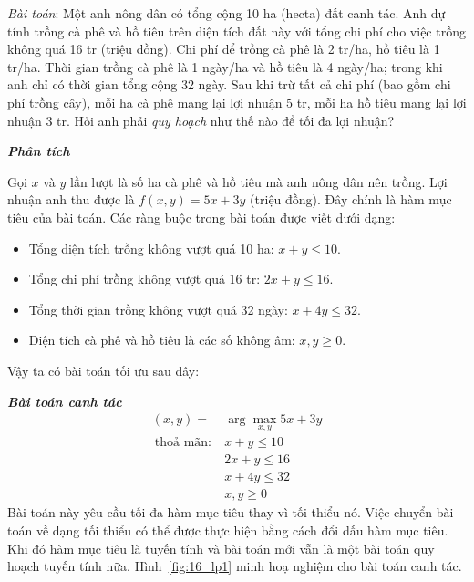 \textit{{Bài toán}}:
Một anh nông dân có tổng cộng 10 ha (hecta) đất canh tác. Anh dự tính trồng cà
phê và hồ tiêu trên diện tích đất này với tổng chi phí cho việc trồng không quá 16 tr (triệu đồng). Chi phí để trồng cà phê là 2 tr/ha, hồ
tiêu là 1 tr/ha. Thời gian trồng cà phê là 1 ngày/ha và hồ tiêu là 4 ngày/ha;
trong khi anh chỉ có thời gian tổng cộng 32 ngày. Sau khi trừ tất cả chi
phí (bao gồm chi phí trồng cây), mỗi ha cà phê mang lại lợi nhuận 5 tr, mỗi ha hồ
tiêu mang lại lợi nhuận 3 tr. Hỏi anh phải \textit{quy hoạch} như thế nào để tối
đa lợi nhuận?

\newpage
\textit{\textbf{Phân tích}}

Gọi $x$ và $y$ lần lượt là số ha cà phê và hồ tiêu mà anh nông dân nên trồng.
Lợi nhuận anh thu được là $f(x, y) = 5x + 3y$ (triệu đồng). Đây chính là hàm
mục tiêu của bài toán. Các ràng buộc trong bài toán được viết dưới dạng:
\begin{itemize}
\item Tổng diện tích trồng không vượt quá 10 ha: $x + y \leq 10$.

\item Tổng chi phí trồng không vượt quá 16 tr: $2x + y \leq 16$.

\item Tổng thời gian trồng không vượt quá 32 ngày: $x + 4y \leq 32$.

\item Diện tích cà phê và hồ tiêu là các số không âm: $x, y \geq 0$.
\end{itemize}
Vậy ta có bài toán tối ưu sau đây:


\textit{\textbf{Bài toán canh tác} }
\begin{equation}
\label{eqn:canhtac}
\begin{aligned}
(x, y) =& \arg\max_{x, y} 5x + 3y \\\
\text{thoả mãn:}~ & x + y \leq 10 \\\
& 2x + y \leq 16 \\\
& x + 4y \leq 32 \\\
& x, y \geq 0
\end{aligned}
\end{equation}
Bài toán này yêu cầu {tối đa hàm mục tiêu} thay vì tối thiểu nó. Việc
chuyển bài toán về dạng {tối thiểu}  có thể được thực hiện bằng cách đổi dấu hàm mục tiêu. Khi đó hàm mục tiêu là tuyến tính và bài toán mới vẫn là một bài toán quy hoạch tuyến tính
nữa. Hình~\ref{fig:16_lp1} minh hoạ nghiệm cho bài toán canh tác.


